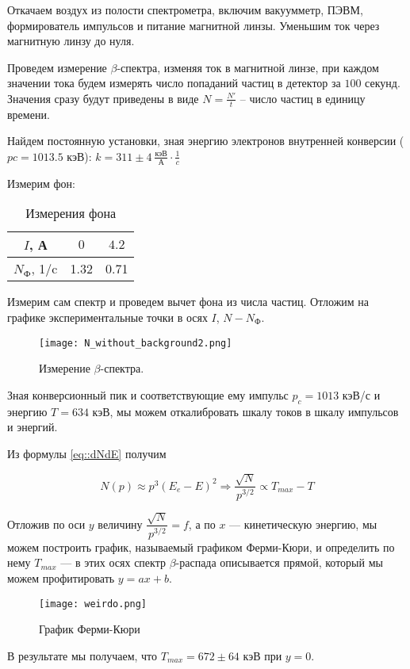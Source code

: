Откачаем воздух из полости спектрометра, включим вакуумметр, ПЭВМ, формирователь
импульсов и питание магнитной линзы. Уменьшим ток через магнитную линзу до нуля.

Проведем измерение $\beta$-спектра, изменяя ток в магнитной линзе, при каждом
значении тока будем измерять число попаданий частиц в детектор за $100$ секунд.
Значения сразу будут приведены в виде $N = \frac{N'}{t}$ -- число частиц в
единицу времени.

Найдем постоянную установки, зная энергию электронов внутренней конверсии
($p c = 1013.5$ кэВ): $k = 311 \pm 4 \: \frac{\text{кэВ}}{\text{А}} \cdot \frac{1}{c}$

Измерим фон:

\begin{table}[h!]
  \caption{Измерения фона}
  \begin{center}
    \begin{tabular}{| c | c | c |}
      \hline
      $I$, А & $0$ & $4.2$\\
      \hline
      $N_{\text{Ф}}$, 1/c & 1.32 & 0.71\\
      \hline
    \end{tabular}
  \end{center}
\end{table}

Измерим сам спектр и проведем вычет фона из числа частиц. Отложим на графике
экспериментальные точки в осях $I$, $N - N_{\text{Ф}}$.

\begin{figure}[h]
  \centering
  \texttt{[image: N\_without\_background2.png]}
  \caption{Измерение $\beta$-спектра.}
  \label{img::N_without_background}
\end{figure}

Зная конверсионный пик и соответствующие ему импульс $ p_c = 1013 $ кэВ/с и
энергию $ T = 634 $ кэВ, мы можем откалибровать шкалу токов в шкалу импульсов и
энергий.

Из формулы \eqref{eq::dNdE} получим

\begin{equation}\label{}
  N(p) \approx p^3 (E_e - E)^2 \Rightarrow \dfrac{\sqrt{N}}{p^{3/2}} \propto T_{max} - T
\end{equation}

Отложив по оси $ y $ величину $ \dfrac{\sqrt{N}}{p^{3/2}} = f $, а по $ x $ ---
кинетическую энергию, мы можем построить график, называемый графиком Ферми-Кюри,
и определить по нему $ T_{max} $ --- в этих осях спектр $\beta$-распада
описывается прямой, который мы можем профитировать $ y = ax +b $.

\begin{figure}[h]
  \centering
  \texttt{[image: weirdo.png]}
  \caption{График Ферми-Кюри}
  \label{img::N_without_background}
\end{figure}

В результате мы получаем, что $T_{max} = 672 \pm 64$ кэВ при $y = 0$.